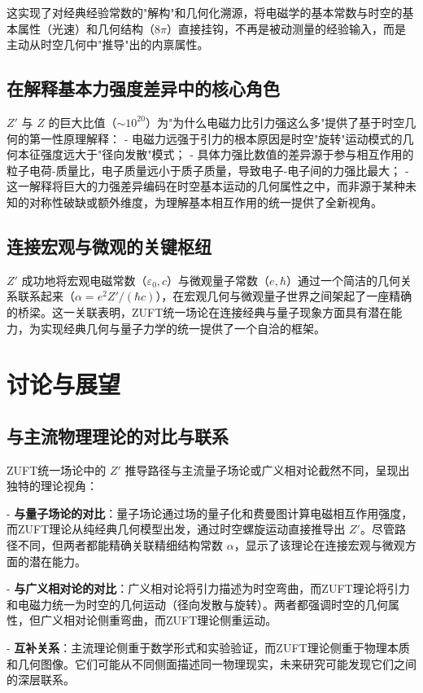 \documentclass[a4paper,12pt]{article}
\theoremstyle{plain}
\begin{document}
这实现了对经典经验常数的"解构"和几何化溯源，将电磁学的基本常数与时空的基本属性（光速）和几何结构（$8\pi$）直接挂钩，不再是被动测量的经验输入，而是主动从时空几何中"推导"出的内禀属性。

\subsection{在解释基本力强度差异中的核心角色}
$Z'$ 与 $Z$ 的巨大比值（$\sim10^{20}$）为"为什么电磁力比引力强这么多"提供了基于时空几何的第一性原理解释：
- 电磁力远强于引力的根本原因是时空"旋转"运动模式的几何本征强度远大于"径向发散"模式；
- 具体力强比数值的差异源于参与相互作用的粒子电荷-质量比，电子质量远小于质子质量，导致电子-电子间的力强比最大；
- 这一解释将巨大的力强差异编码在时空基本运动的几何属性之中，而非源于某种未知的对称性破缺或额外维度，为理解基本相互作用的统一提供了全新视角。

\subsection{连接宏观与微观的关键枢纽}
$Z'$ 成功地将宏观电磁常数（$\varepsilon_0, c$）与微观量子常数（$e, \hbar$）通过一个简洁的几何关系联系起来（$\alpha = e^2Z'/(\hbar c)$），在宏观几何与微观量子世界之间架起了一座精确的桥梁。这一关联表明，ZUFT统一场论在连接经典与量子现象方面具有潜在能力，为实现经典几何与量子力学的统一提供了一个自洽的框架。

\section{讨论与展望}

\subsection{与主流物理理论的对比与联系}

ZUFT统一场论中的 $Z'$ 推导路径与主流量子场论或广义相对论截然不同，呈现出独特的理论视角：

- \textbf{与量子场论的对比}：量子场论通过场的量子化和费曼图计算电磁相互作用强度，而ZUFT理论从纯经典几何模型出发，通过时空螺旋运动直接推导出 $Z'$。尽管路径不同，但两者都能精确关联精细结构常数 $\alpha$，显示了该理论在连接宏观与微观方面的潜在能力。

- \textbf{与广义相对论的对比}：广义相对论将引力描述为时空弯曲，而ZUFT理论将引力和电磁力统一为时空的几何运动（径向发散与旋转）。两者都强调时空的几何属性，但广义相对论侧重弯曲，而ZUFT理论侧重运动。

- \textbf{互补关系}：主流理论侧重于数学形式和实验验证，而ZUFT理论侧重于物理本质和几何图像。它们可能从不同侧面描述同一物理现实，未来研究可能发现它们之间的深层联系。
\end{document}

